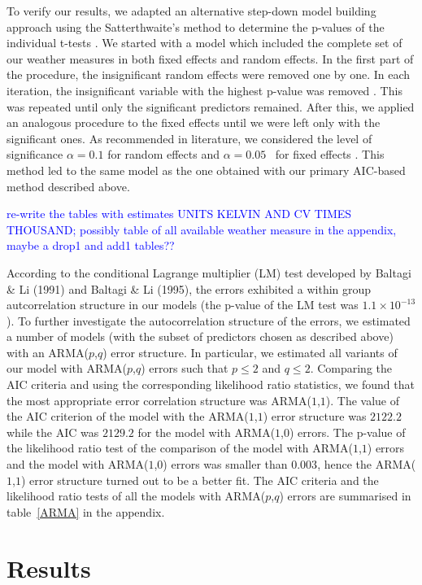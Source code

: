 \documentclass[12pt]{iopart}
\begin{document}
To verify our results, we adapted an alternative step-down model building
approach using the Satterthwaite’s method to determine the p-values of the individual
t-tests \cite{lmerTest}. We started with a model which included the complete set of our weather measures in both fixed effects and random effects. In the first part of the procedure, the insignificant random effects were removed one by one. In each iteration, the insignificant variable with the highest p-value was removed . This was repeated until only the significant predictors remained. After this, we applied an analogous procedure to the fixed effects until we were left only with the significant ones. As recommended in literature, we considered the level of significance $\alpha=0.1$ for random effects and $\alpha=0.05$~ for fixed effects \cite{lmerTest}. This method led to the same model as the one obtained with our primary AIC-based method described above.

\textcolor{blue}{re-write the tables with estimates  UNITS KELVIN AND CV TIMES THOUSAND; possibly table of all available weather measure in the appendix, maybe a drop1 and add1 tables??}


According to the conditional Lagrange multiplier (LM) test developed by Baltagi \& Li (1991) and Baltagi \& Li (1995), the errors exhibited a within group autcorrelation structure in our models (the p-value of the LM test was $1.1\times10^{-13}$). To further investigate the autocorrelation structure of the errors, we estimated a number of models (with the subset of predictors chosen as described above) with an ARMA($p$,$q$) error structure. In particular, we estimated all variants of our model with ARMA($p$,$q$) errors such that $p\leq2$ and $q\leq2$. Comparing the AIC criteria and using the corresponding likelihood ratio statistics, we found that the most appropriate error correlation structure was ARMA($1$,$1$). The value of the AIC criterion of the model with the ARMA($1$,$1$) error structure was $2122.2$ while the AIC was $2129.2$ for the model with ARMA($1$,$0$) errors.  The p-value of the likelihood ratio test of the comparison of the model with ARMA($1$,$1$) errors and the model with ARMA($1$,$0$) errors was smaller than $0.003$, hence the ARMA($1$,$1$) error structure turned out to be a better fit. The AIC criteria and the likelihood ratio tests of all the models with ARMA($p$,$q$) errors are summarised in table~\ref{ARMA} in the appendix.

	\section{Results}\label{Results}
	
\end{document}
